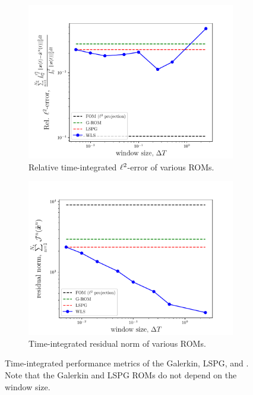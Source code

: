 \begin{figure}
\begin{center}
\begin{subfigure}[t]{0.45\textwidth}
\includegraphics[width=1.\linewidth]{figs/sod/error_vs_window_compare.pdf}
\caption{Relative time-integrated $\ell^2$-error of various ROMs.}
\label{fig:sod_error_a}
\end{subfigure}
\begin{subfigure}[t]{0.45\textwidth}
\includegraphics[width=1.\linewidth]{figs/sod/objective_vs_window_compare.pdf}
\caption{Time-integrated residual norm of various ROMs.} 
\label{fig:sod_error_b}
\end{subfigure}
\caption{Time-integrated performance metrics of the Galerkin, LSPG, and \methodAcronymROMs.  Note that the Galerkin and LSPG ROMs do not depend on the window size.} 
\label{fig:sod_error}
\end{center}
\end{figure}

